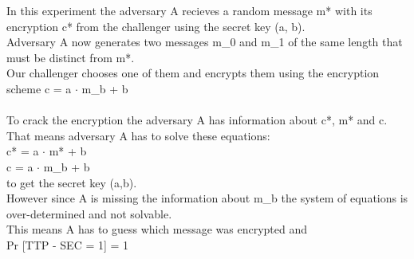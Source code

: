 In this experiment the adversary A recieves a random message m* with its encryption c* from the challenger using the secret key (a, b). \\
Adversary A now generates two messages m_{0} and m_{1} of the same length that must be distinct from m*. \\
Our challenger chooses one of them and encrypts them using the encryption scheme c = a  \(\cdot\) m_{b} + b \\
\\
To crack the encryption the adversary A has information about c*, m* and c. \\
That means adversary A has to solve these equations: \\
c* = a  \(\cdot\) m* + b \\
c = a  \(\cdot\) m_{b} + b \\
to get the secret key (a,b).\\
However since A is missing the information about m_{b} the system of equations is over-determined and not solvable. \\
This means A has to guess which message was encrypted and \\
Pr [TTP - SEC = 1] = 1  \\

